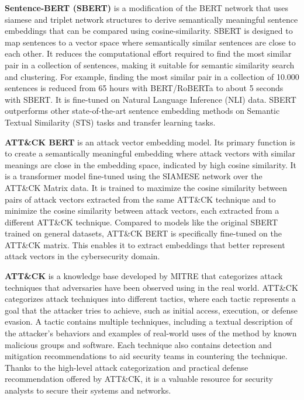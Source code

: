 \textbf{Sentence-BERT (SBERT)} is a modification of the BERT network that uses siamese and triplet network structures to derive semantically meaningful sentence embeddings that can be compared using cosine-similarity. SBERT is designed to map sentences to a vector space where semantically similar sentences are close to each other. It reduces the computational effort required to find the most similar pair in a collection of sentences, making it suitable for semantic similarity search and clustering. For example, finding the most similar pair in a collection of 10.000 sentences is reduced from 65 hours with BERT/RoBERTa to about 5 seconds with SBERT\@. It is fine-tuned on Natural Language Inference (NLI) data. SBERT outperforms other state-of-the-art sentence embedding methods on Semantic Textual Similarity (STS) tasks and transfer learning tasks. \cite{reimersgurevych2019}

\textbf{ATT{\&}CK BERT} is an attack vector embedding model. Its primary function is to create a semantically meaningful embedding where attack vectors with similar meanings are close in the embedding space, indicated by high cosine similarity. It is a transformer model fine-tuned using the SIAMESE network over the ATT{\&}CK Matrix data. It is trained to maximize the cosine similarity between pairs of attack vectors extracted from the same ATT{\&}CK technique and to minimize the cosine similarity between attack vectors, each extracted from a different ATT{\&}CK technique. Compared to models like the original SBERT trained on general datasets, ATT{\&}CK BERT is specifically fine-tuned on the ATT{\&}CK matrix. This enables it to extract embeddings that better represent attack vectors in the cybersecurity domain. \cite{basel2023}

\textbf{ATT{\&}CK} is a knowledge base developed by MITRE that categorizes attack techniques that adversaries have been observed using in the real world. ATT{\&}CK categorizes attack techniques into different tactics, where each tactic represents a goal that the attacker tries to achieve, such as initial access, execution, or defense evasion. A tactic contains multiple techniques, including a textual description of the attacker's behaviors and examples of real-world uses of the method by known malicious groups and software. Each technique also contains detection and mitigation recommendations to aid security teams in countering the technique. Thanks to the high-level attack categorization and practical defense recommendation offered by ATT{\&}CK, it is a valuable resource for security analysts to secure their systems and networks. \cite{basel2023}



